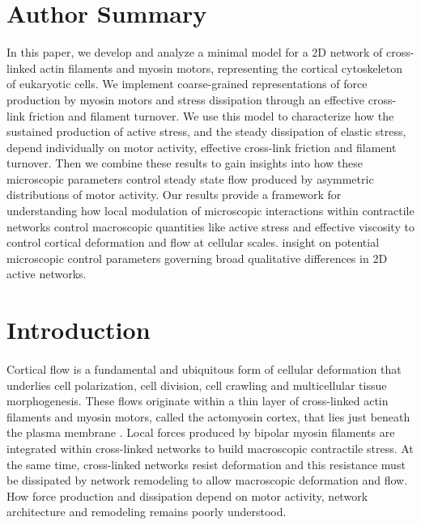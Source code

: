 \documentclass[10pt,letterpaper]{article}
\begin{document}
\section*{Author Summary}
In this paper, we develop and analyze a minimal model for a 2D network of cross-linked actin filaments and myosin motors, representing the cortical cytoskeleton of eukaryotic cells.  We implement coarse-grained representations of force production by myosin motors and stress dissipation through an effective cross-link friction and filament turnover. We use this model to characterize how the sustained production of active stress, and the steady dissipation of elastic stress, depend individually on motor activity,  effective cross-link friction and filament turnover. Then we combine these results to gain insights into how these microscopic parameters control steady state flow produced by asymmetric distributions of motor activity. Our results provide a framework for understanding how local modulation of microscopic interactions within contractile networks control macroscopic quantities like active stress and effective viscosity to control cortical deformation and flow at cellular scales. insight on potential microscopic control parameters governing broad qualitative differences in 2D active networks. 
\linenumbers

\section*{Introduction}

\paragraph{}  Cortical flow is a fundamental and ubiquitous form of cellular deformation that underlies cell polarization, cell division, cell crawling and multicellular tissue morphogenesis\cite{cellmech_flows3,cellmech_flows2,Benink:2000aa,Wilson:2010aa,Munjal:2015aa}.  These flows originate within a thin layer of cross-linked actin filaments and myosin motors, called the actomyosin cortex, that lies just beneath the plasma membrane \cite{Salbreux2012536}. Local forces produced by bipolar myosin filaments are integrated within cross-linked networks to build macroscopic contractile stress\cite{Murrell:2015aa,Bendix20083126,Janson1005}.  At the same time, cross-linked networks resist deformation and this resistance must be dissipated by network remodeling to allow macroscopic deformation and flow.  How force production and dissipation depend on motor activity, network architecture and remodeling remains poorly understood.
\end{document}
